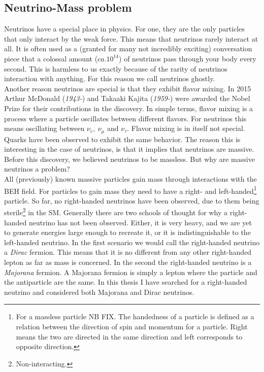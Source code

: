 \subsection{Neutrino-Mass problem}
Neutrinos have a special place in physics. For one, they are the only particles that
only interact by the weak force. This means that neutrinos rarely interact at all. It is often used
as a (granted for many not incredibly exciting) conversation piece that a colossal amount ($ca.10^{14}$) of 
neutrinos pass through your body every second. This is harmless to us exactly because of the rarity
of neutrinos interaction with anything. For this reason we call neutrinos ghostly. 
\\
Another reason neutrinos are special is that they exhibit flavor mixing. In 2015 Arthur McDonald (\emph{1943-}) and 
Takaaki Kajita (\emph{1959-}) were awarded the Nobel Prize for their contributions in the discovery. In simple terms,
flavor mixing is a process where a particle oscillates between different flavors. For neutrinos this 
means oscillating between $\nu_e,\ \nu_\mu$ and $\nu_\tau$. Flavor mixing is in itself not special.
Quarks have been observed to exhibit the same behavior. The reason this is interesting in the case of 
neutrinos, is that it implies that neutrinos are massive. Before this discovery, we believed neutrinos to be
massless. But why are massive neutrinos a problem?
\\
All (previously) known massive particles gain mass through interactions with the \ac{BEH} field. For particles
to gain mass they need to have a right- and left-handed\footnote{For a massless particle NB FIX. The handedness of a particle is defined
as a relation between the direction of spin and momentum for a particle. Right means the two are directed
in the same direction and left corresponds to opposite direction.} particle. So far, no right-handed neutrinos
have been observed, due to them being sterile\footnote{Non-interacting.} in the \ac{SM}. Generally there are two schools of thought for why a right-handed neutrino has not been 
observed. Either, it is very heavy, and we are yet to generate energies large enough to recreate it, or 
it is indistinguishable to the left-handed neutrino. In the first scenario we would call the right-handed 
neutrino a \emph{Dirac} fermion. This means that it is no different from any other right-handed lepton as far as mass is concerned. 
In the second the right-handed neutrino is a \emph{Majorana} fermion. A Majorana fermion is simply a lepton where the particle
and the antiparticle are the same. In this thesis I have searched for a right-handed neutrino and considered
both Majorana and Dirac neutrinos.

